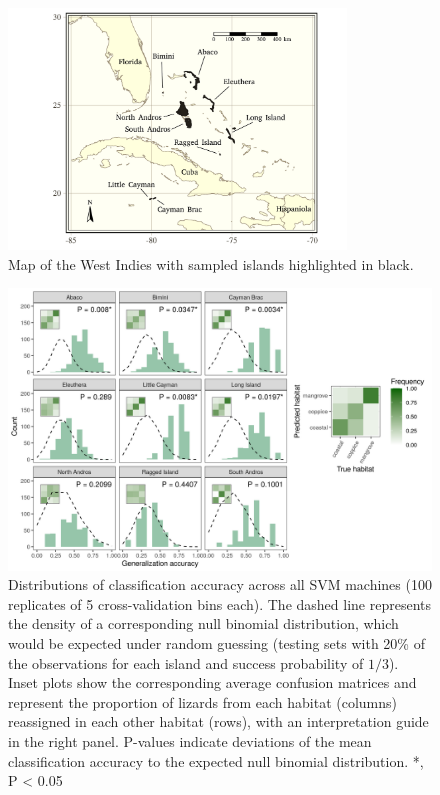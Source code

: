 \begin{figure}[H]
    \centering
	\includegraphics[width=0.8\textwidth]{figures/map.pdf}
	\caption{Map of the West Indies with sampled islands highlighted in black.}
	\label{fig:map}
\end{figure}

\begin{figure}[H]
    \centering
	\includegraphics[width=\textwidth]{figures/classif_svm_pca.png}
	\caption{Distributions of classification accuracy across all SVM machines (100 replicates of 5 cross-validation bins each). The dashed line represents the density of a corresponding null binomial distribution, which would be expected under random guessing (testing sets with 20\% of the observations for each island and success probability of $1/3$). Inset plots show the corresponding average confusion matrices and represent the proportion of lizards from each habitat (columns) reassigned in each other habitat (rows), with an interpretation guide in the right panel. P-values indicate deviations of the mean classification accuracy to the expected null binomial distribution. *, P < 0.05}
	\label{fig:classif_svm_pca}
\end{figure}

